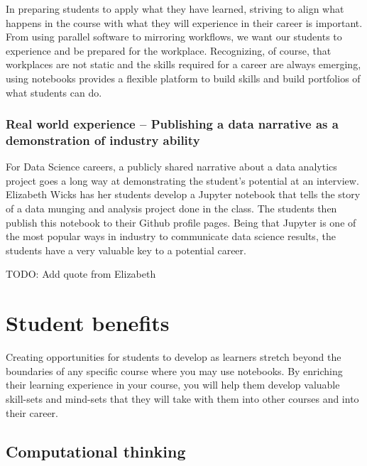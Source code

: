\documentclass[]{book}
\begin{document}
In preparing students to apply what they have learned, striving to align what
happens in the course with what they will experience in their career is
important. From using parallel software to mirroring workflows, we want our
students to experience and be prepared for the workplace. Recognizing, of
course, that workplaces are not static and the skills required for a career are
always emerging, using notebooks provides a flexible platform to build skills
and build portfolios of what students can do.

\hypertarget{real-world-experience-publishing-a-data-narrative-as-a-demonstration-of-industry-ability}{%
\subsubsection{Real world experience -- Publishing a data narrative as a demonstration of industry ability}\label{real-world-experience-publishing-a-data-narrative-as-a-demonstration-of-industry-ability}}

For Data Science careers, a publicly shared narrative about a data analytics
project goes a long way at demonstrating the student's potential at an
interview. Elizabeth Wicks has her students develop a Jupyter notebook that
tells the story of a data munging and analysis project done in the class. The
students then publish this notebook to their Github profile pages. Being that
Jupyter is one of the most popular ways in industry to communicate data science
results, the students have a very valuable key to a potential career.

TODO: Add quote from Elizabeth

\hypertarget{student-benefits}{%
\section{Student benefits}\label{student-benefits}}

Creating opportunities for students to develop as learners stretch beyond the
boundaries of any specific course where you may use notebooks. By enriching
their learning experience in your course, you will help them develop valuable
skill-sets and mind-sets that they will take with them into other courses and
into their career.

\hypertarget{computational-thinking}{%
\subsection{Computational thinking}\label{computational-thinking}}
\end{document}

